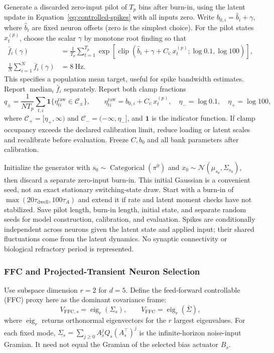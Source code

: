 Generate a discarded zero-input pilot of $T_p$ bins after burn-in, using the latent update in Equation~\eqref{eq:controlled-spikes} with all inputs zero. Write $b_{0,i}=\widehat b_i+\gamma$, where $\widehat b_i$ are fixed neuron offsets (zero is the simplest choice). For the pilot states $x_t^{(p)}$, choose the scalar $\gamma$ by monotone root finding so that
\begin{align}
 \bar f_i(\gamma)&=\frac1{T_p}\sum_{t=1}^{T_p}
  \exp\!\left[\operatorname{clip}(\widehat b_i+\gamma+C_{i:}x_t^{(p)};
       \log0.1,\log100)\right],\\
 \frac1N\sum_{i=1}^N\bar f_i(\gamma)&=8\ \mathrm{Hz}.
 \label{eq:pilot-rate}
\end{align}
This specifies a population mean target, useful for spike bandwidth estimates. Report $\operatorname{median}_i\bar f_i$ separately. Report both clamp fractions
\begin{equation}
 q_\pm=\frac1{NT_p}\sum_{t,i}
 \mathbf1\{\eta^{\mathrm{raw}}_{ti}\in\mathcal C_\pm\},\qquad
 \eta^{\mathrm{raw}}_{ti}=b_{0,i}+C_{i:}x_t^{(p)},\quad
 \eta_- =\log0.1,\quad\eta_+=\log100,
\end{equation}
where $\mathcal C_+=[\eta_+,\infty)$ and $\mathcal C_-=(-\infty,\eta_-]$, and $\mathbf1$ is the indicator function. If clamp occupancy exceeds the declared calibration limit, reduce loading or latent scales and recalibrate before evaluation. Freeze $C,b_0$ and all bank parameters after calibration.

Initialize the generator with $s_0\sim\operatorname{Categorical}(\pi^0)$ and $x_0\sim\mathcal N(\mu_{s_0},\Sigma_{s_0})$, then discard a separate zero-input burn-in. This initial Gaussian is a convenient seed, not an exact stationary switching-state draw. Start with a burn-in of $\max(20\tau_{\mathrm{dwell}},100\tau_A)$ and extend it if rate and latent moment checks have not stabilized. Save pilot length, burn-in length, initial state, and separate random seeds for model construction, calibration, and evaluation. Spikes are conditionally independent across neurons given the latent state and applied input; their shared fluctuations come from the latent dynamics. No synaptic connectivity or biological refractory period is represented.

\subsubsection{FFC and Projected-Transient Neuron Selection}
Use subspace dimension $r=2$ for $d=5$. Define the feed-forward controllable (FFC) proxy here as the dominant covariance frame:
\begin{equation}
 V_{\mathrm{FFC},s}=\operatorname{eig}_r(\Sigma_s),\qquad
 V_{\mathrm{FFC}}=\operatorname{eig}_r(\bar\Sigma),
 \label{eq:ffc-definition}
\end{equation}
where $\operatorname{eig}_r$ returns orthonormal eigenvectors for the $r$ largest eigenvalues. For each fixed mode, $\Sigma_s=\sum_{j\ge0}A_s^jQ_s(A_s^{\top})^j$ is the infinite-horizon noise-input Gramian. It need not equal the Gramian of the selected bias actuator $B_s$.

